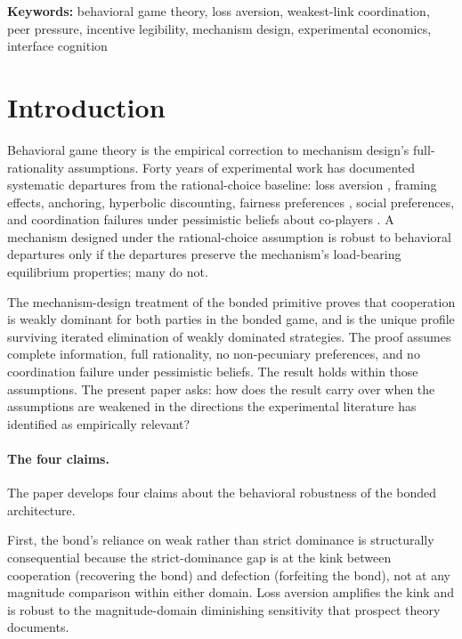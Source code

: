 \documentclass[11pt,a4paper]{article}
\theoremstyle{definition}
\theoremstyle{remark}
\begin{document}
\medskip
\noindent\textbf{Keywords:}
behavioral game theory, loss aversion, weakest-link coordination,
peer pressure, incentive legibility, mechanism design,
experimental economics, interface cognition

\section{Introduction}
\label{sec:intro}

Behavioral game theory \citep{camerer2003behavioral} is the
empirical correction to mechanism design's full-rationality
assumptions. Forty years of experimental work has documented
systematic departures from the rational-choice baseline: loss
aversion \citep{kahneman_tversky_1979,
tversky_kahneman_1992}, framing effects, anchoring, hyperbolic
discounting, fairness preferences \citep{fehr_schmidt_1999,
bolton_ockenfels_2000}, social preferences, and coordination
failures under pessimistic beliefs about co-players
\citep{vanhuyck_battalio_beil_1990}. A mechanism designed under
the rational-choice assumption is robust to behavioral
departures only if the departures preserve the mechanism's
load-bearing equilibrium properties; many do not.

The mechanism-design treatment of the bonded primitive proves
that cooperation is weakly dominant for both parties in the
bonded game, and is the unique profile surviving
iterated elimination of weakly dominated strategies. The proof
assumes complete information, full rationality, no non-pecuniary
preferences, and no coordination failure under pessimistic
beliefs. The result holds within those assumptions. The present
paper asks: how does the result carry over when the assumptions
are weakened in the directions the experimental literature has
identified as empirically relevant?

\paragraph{The four claims.}
The paper develops four claims about the behavioral robustness of
the bonded architecture.

First, the bond's reliance on weak rather than strict dominance
is structurally consequential because the strict-dominance gap is
at the kink between cooperation (recovering the bond) and
defection (forfeiting the bond), not at any magnitude comparison
within either domain. Loss aversion amplifies the kink and is
robust to the magnitude-domain diminishing sensitivity that
prospect theory documents.
\end{document}
